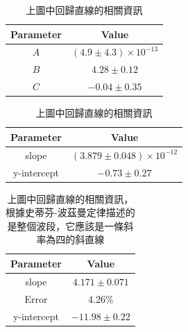 \begin{table}[htb!]
\centering
\caption{上圖中回歸直線的相關資訊}
\begin{tabular}{cc}
\toprule
Parameter & Value \\
\midrule
$A$ & $(4.9 \pm 4.3)\times 10^{-13}$ \\
$B$ & $4.28 \pm 0.12$ \\
$C$ & $-0.04 \pm 0.35$ \\
\bottomrule
\end{tabular}
\end{table}
\begin{table}[htb!]
\centering
\caption{上圖中回歸直線的相關資訊}
\begin{tabular}{cc}
\toprule
Parameter & Value \\
\midrule
slope & $(3.879 \pm 0.048)\times 10^{-12}$ \\
y-intercept & $-0.73 \pm 0.27$ \\
\bottomrule
\end{tabular}
\end{table}
\begin{table}[htb!]
\centering
\caption{上圖中回歸直線的相關資訊，根據史蒂芬-波茲曼定律描述的是整個波段，它應該是一條斜率為四的斜直線}
\begin{tabular}{cc}
\toprule
Parameter & Value \\
\midrule
slope & $4.171 \pm 0.071$ \\
Error & $4.26\%$ \\
y-intercept & $-11.98 \pm 0.22$ \\
\bottomrule
\end{tabular}
\end{table}
